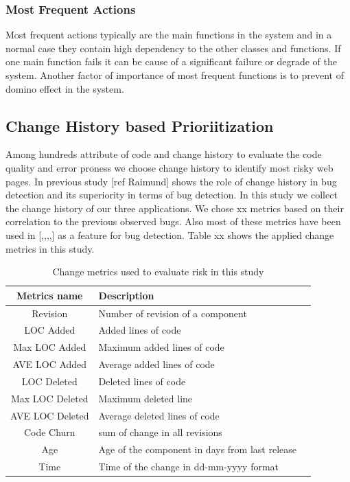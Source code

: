 \subsubsection{Most Frequent Actions}
Most frequent actions typically are the main functions in the system and in a 
normal case they contain high dependency to the other classes and functions. 
If one main function fails it can be cause of a significant failure or degrade of the system. 
Another factor of importance of most frequent functions is to prevent of domino effect in the system. 


\subsection{Change History based Prioriitization}
Among hundreds attribute of code and change history to evaluate the code quality and 
error proness we choose change history to identify most risky web pages. In previous 
study [ref Raimund] shows the role of change history in bug detection and its superiority 
in terms of bug detection. In this study we collect the change history of our three applications. 
We chose xx metrics based on their correlation to the previous observed bugs.
Also most of these metrics have been used in [,,,,] as a feature for bug detection. 
Table xx shows the applied change metrics in this study. 

	\begin{table}
	\caption{Change metrics used to evaluate risk in this study}
	\begin{tabular*}{.4\textwidth}{c @{\extracolsep{\fill}} |ll}
	\hline
	Metrics name & Description \\\hline
	Revision & Number of revision of a component  \\\hline
	LOC Added&   Added lines of code \\\hline
	Max LOC Added  & Maximum added lines of code \\\hline
	AVE LOC Added  & Average added lines of code \\\hline
	LOC Deleted  & Deleted lines of code  \\\hline
	Max LOC Deleted & Maximum deleted line\\\hline
	AVE LOC Deleted & Average deleted lines of code \\\hline
	Code Churn & sum of change in all revisions \\\hline
	Age & Age of the component in days from last release \\\hline
	Time & Time of the change in dd-mm-yyyy format \\\hline		
	\end{tabular*}
		\label{tab:historyMetrics2}
	\end{table}
		

